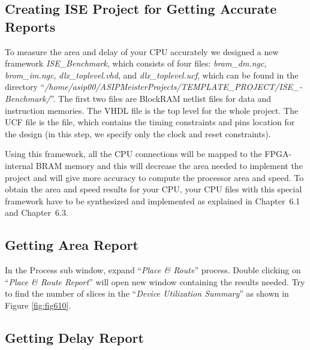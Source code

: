 \hypertarget{creating-ise-project-for-getting-accurate-reports}{%
\subsection{Creating ISE Project for Getting Accurate
Reports}\label{creating-ise-project-for-getting-accurate-reports}}

To measure the area and delay of your CPU accurately we designed a new
framework \emph{ISE\_Benchmark}, which consists of four files:
\emph{bram\_dm.ngc}, \emph{brom\_im.ngc}, \emph{dlx\_toplevel.vhd}, and
\emph{dlx\_toplevel.ucf}, which can be found in the directory
``\emph{/home/asip00/­ASIPMeisterProjects/­TEMPLATE\_PROJECT/­ISE\_­Benchmark/}''.
The first two files are BlockRAM netlist files for data and instruction
memories. The VHDL file is the top level for the whole project. The UCF
file is the file, which contains the timing constraints and pins
location for the design (in this step, we specify only the clock and
reset constraints).

Using this framework, all the CPU connections will be mapped to the
FPGA-internal BRAM memory and this will decrease the area needed to
implement the project and will give more accuracy to compute the
processor area and speed. To obtain the area and speed results for your
CPU, your CPU files with this special framework have to be synthesized
and implemented as explained in Chapter~6.1 and Chapter~6.3.

\hypertarget{getting-area-report}{%
\subsection{Getting Area Report}\label{getting-area-report}}

In the Process sub window, expand ``\emph{Place \& Route}'' process.
Double clicking on ``\emph{Place \& Route Report}'' will open new window
containing the results needed. Try to find the number of slices in the
``\emph{Device Utilization Summary}'' as shown in
Figure \ref{fig:fig610}.

\hypertarget{getting-delay-report}{%
\subsection{Getting Delay Report}\label{getting-delay-report}}

